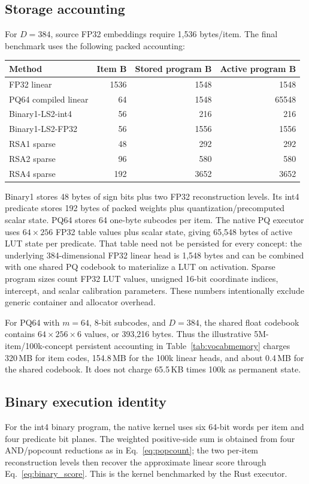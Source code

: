 \subsection{Storage accounting}
For $D=384$, source FP32 embeddings require 1,536 bytes/item. The final benchmark uses the following packed accounting:
\begin{center}
\small
\begin{tabular}{lrrr}
\toprule
Method & Item B & Stored program B & Active program B\\
\midrule
FP32 linear & 1536 & 1548 & 1548\\
PQ64 compiled linear & 64 & 1548 & 65548\\
Binary1-LS2-int4 & 56 & 216 & 216\\
Binary1-LS2-FP32 & 56 & 1556 & 1556\\
RSA1 sparse & 48 & 292 & 292\\
RSA2 sparse & 96 & 580 & 580\\
RSA4 sparse & 192 & 3652 & 3652\\
\bottomrule
\end{tabular}
\end{center}
Binary1 stores 48 bytes of sign bits plus two FP32 reconstruction levels. Its int4 predicate stores 192 bytes of packed weights plus quantization/precomputed scalar state. PQ64 stores 64 one-byte subcodes per item. The native PQ executor uses $64\times256$ FP32 table values plus scalar state, giving 65,548 bytes of active LUT state per predicate. That table need not be persisted for every concept: the underlying 384-dimensional FP32 linear head is 1,548 bytes and can be combined with one shared PQ codebook to materialize a LUT on activation. Sparse \rsa program sizes count FP32 LUT values, unsigned 16-bit coordinate indices, intercept, and scalar calibration parameters. These numbers intentionally exclude generic container and allocator overhead.

For PQ64 with $m=64$, 8-bit subcodes, and $D=384$, the shared float codebook contains $64\times256\times6$ values, or 393,216 bytes. Thus the illustrative 5M-item/100k-concept persistent accounting in Table~\ref{tab:vocabmemory} charges 320\,MB for item codes, 154.8\,MB for the 100k linear heads, and about 0.4\,MB for the shared codebook. It does not charge 65.5\,KB times 100k as permanent state.

\subsection{Binary execution identity}
For the int4 binary program, the native kernel uses six 64-bit words per item and four predicate bit planes. The weighted positive-side sum is obtained from four AND/popcount reductions as in Eq.~\eqref{eq:popcount}; the two per-item reconstruction levels then recover the approximate linear score through Eq.~\eqref{eq:binary_score}. This is the kernel benchmarked by the Rust  executor.

